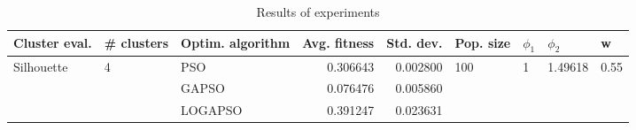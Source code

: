 \begin{table}
\centering
\caption{Results of experiments}
\begin{tabular}{lllrrllll}
\toprule
              Cluster eval. &        \# clusters & Optim. algorithm &  Avg. fitness &  Std. dev. &            Pop. size &         $\phi_{1}$ &               $\phi_{2}$ &                     w \\
\midrule
\multirow{3}{*}{Silhouette} & \multirow{3}{*}{4} &              PSO &      0.306643 &   0.002800 & \multirow{3}{*}{100} & \multirow{3}{*}{1} & \multirow{3}{*}{1.49618} & \multirow{3}{*}{0.55} \\
                            &                    &            GAPSO &      0.076476 &   0.005860 &                      &                    &                          &                       \\
                            &                    &          LOGAPSO &      0.391247 &   0.023631 &                      &                    &                          &                       \\
\bottomrule
\end{tabular}
\end{table}
